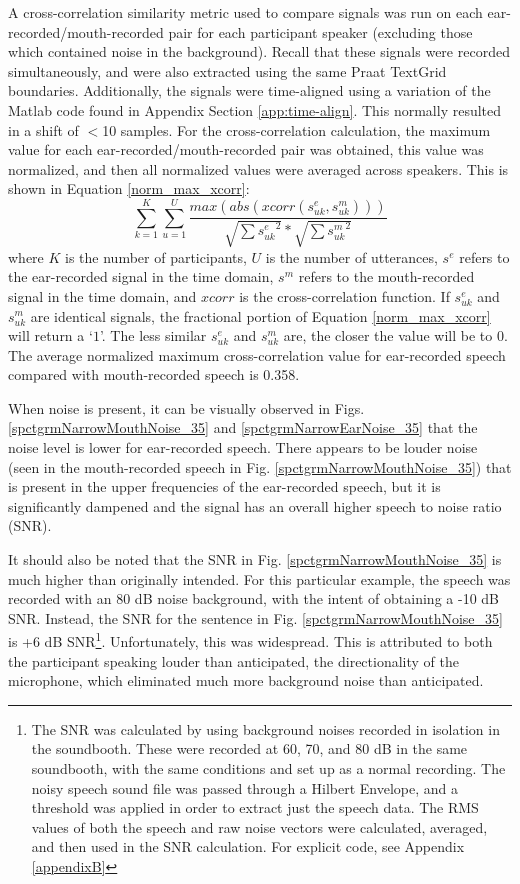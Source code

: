 A cross-correlation similarity metric used to compare signals was run on each ear-recorded/mouth-recorded pair for each participant speaker (excluding those which contained noise in the background).  Recall that these signals were recorded simultaneously, and were also extracted using the same Praat TextGrid boundaries.  Additionally, the signals were time-aligned using a variation of the Matlab code found in Appendix Section \ref{app:time-align}.  This normally resulted in a shift of $<$10 samples.  For the cross-correlation calculation, the maximum value for each ear-recorded/mouth-recorded pair was obtained, this value was normalized, and then all normalized values were averaged across speakers.  This is shown in Equation \ref{norm_max_xcorr}:
%
\begin{equation}\label{norm_max_xcorr}
\sum_{k=1}^{K} \sum_{u=1}^{U} \dfrac{max(abs(xcorr(s^e_{uk}, s^m_{uk})))}{\sqrt{\sum {s^e_{uk}}^2}*\sqrt{\sum {s^m_{uk}}^2}}
\end{equation}
%
where $K$ is the number of participants, $U$ is the number of utterances, $s^e$ refers to the ear-recorded signal in the time domain, $s^m$ refers to the mouth-recorded signal in the time domain, and $xcorr$ is the cross-correlation function. If $s^e_{uk}$ and $s^m_{uk}$ are identical signals, the fractional portion of Equation \ref{norm_max_xcorr} will return a `$1$'.  The less similar $s^e_{uk}$ and $s^m_{uk}$ are, the closer the value will be to $0$. The average normalized maximum cross-correlation value for ear-recorded speech compared with mouth-recorded speech is 0.358.

When noise is present, it can be visually observed in Figs. \ref{spctgrmNarrowMouthNoise_35} and \ref{spctgrmNarrowEarNoise_35} that the noise level is lower for ear-recorded speech.  There appears to be louder noise (seen in the mouth-recorded speech in Fig. \ref{spctgrmNarrowMouthNoise_35}) that is present in the upper frequencies of the ear-recorded speech, but it is significantly dampened and the signal has an overall higher speech to noise ratio (SNR).

It should also be noted that the SNR in Fig. \ref{spctgrmNarrowMouthNoise_35} is much higher than originally intended.  For this particular example, the speech was recorded with an 80 dB noise background, with the intent of obtaining a -10 dB SNR.  Instead, the SNR for the sentence in Fig. \ref{spctgrmNarrowMouthNoise_35} is +6 dB SNR\footnote{The SNR was calculated by using background noises recorded in isolation in the soundbooth.  These were recorded at 60, 70, and 80 dB in the same soundbooth, with the same conditions and set up as a normal recording.  The noisy speech sound file was passed through a Hilbert Envelope, and a threshold was applied in order to extract just the speech data.  The RMS values of both the speech and raw noise vectors were calculated, averaged, and then used in the SNR calculation.  For explicit code, see Appendix \ref{appendixB}}.  Unfortunately, this was widespread. This is attributed to both the participant speaking louder than anticipated, the directionality of the microphone, which eliminated much more background noise than anticipated.



